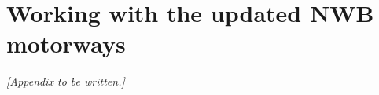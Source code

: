 
\section{Working with the updated NWB motorways}
\label{sec:nwb_updated}

\emph{[Appendix to be written.]}
